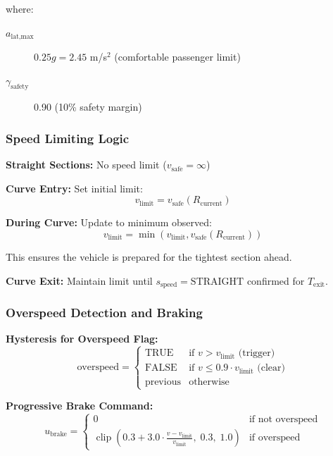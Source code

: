 \documentclass[12pt]{article}
\begin{document}
where:
\begin{description}
    \item[\textbf{$a_{\text{lat,max}}$}] $0.25g = 2.45$ m/s$^2$ (comfortable passenger limit)
    \item[\textbf{$\gamma_{\text{safety}}$}] 0.90 (10\% safety margin)
\end{description}

\subsubsection{Speed Limiting Logic}

\textbf{Straight Sections:} No speed limit ($v_{\text{safe}} = \infty$)

\textbf{Curve Entry:} Set initial limit:
\begin{equation}
v_{\text{limit}} = v_{\text{safe}}(R_{\text{current}})
\end{equation}

\textbf{During Curve:} Update to minimum observed:
\begin{equation}
v_{\text{limit}} = \min(v_{\text{limit}}, v_{\text{safe}}(R_{\text{current}}))
\end{equation}

This ensures the vehicle is prepared for the tightest section ahead.

\textbf{Curve Exit:} Maintain limit until $s_{\text{speed}} = \text{STRAIGHT}$ confirmed for $T_{\text{exit}}$.

\subsubsection{Overspeed Detection and Braking}

\textbf{Hysteresis for Overspeed Flag:}
\begin{equation}
\text{overspeed} = \begin{cases}
\text{TRUE} & \text{if } v > v_{\text{limit}} \text{ (trigger)} \\
\text{FALSE} & \text{if } v \leq 0.9 \cdot v_{\text{limit}} \text{ (clear)} \\
\text{previous} & \text{otherwise}
\end{cases}
\end{equation}

\textbf{Progressive Brake Command:}
\begin{equation}
u_{\text{brake}} = \begin{cases}
0 & \text{if not overspeed} \\
\operatorname{clip}\!\left(0.3 + 3.0 \cdot \frac{v - v_{\text{limit}}}{v_{\text{limit}}}, \; 0.3, \; 1.0\right) & \text{if overspeed}
\end{cases}
\end{equation}
\end{document}
